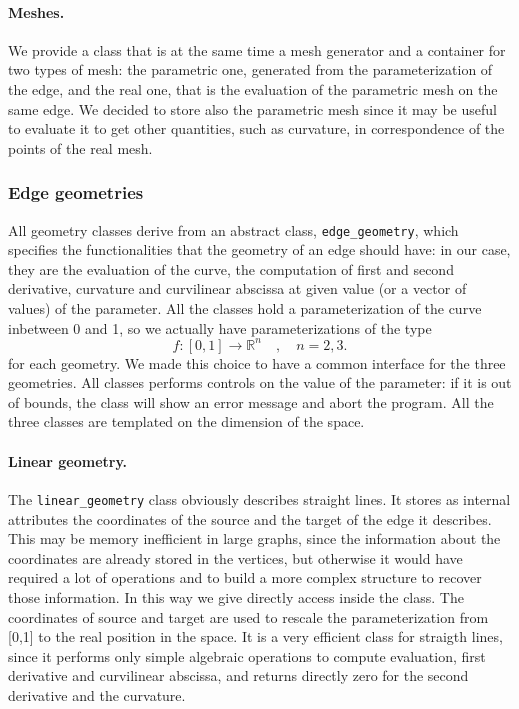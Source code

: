 \documentclass[10pt]{article} %
\newcommand{\classname}[1]{\texttt{#1}}
\begin{document}
	\paragraph{Meshes.} We provide a class that is at the same time a mesh generator and a container for two types of mesh: the parametric one, generated from the parameterization of the edge, and the real one, that is the evaluation of the parametric mesh on the same edge. We decided to store also the parametric mesh since it may be useful to evaluate it to get other quantities, such as curvature, in correspondence of the points of the real mesh.
	
	\subsubsection{Edge geometries}
	All geometry classes derive from an abstract class, \classname{edge\_geometry}, which specifies the functionalities that the geometry of an edge should have: in our case, they are the evaluation of the curve, the computation of first and second derivative, curvature and curvilinear abscissa at given value (or a vector of values) of the parameter. All the classes hold a parameterization of the curve inbetween 0 and 1, so we actually have parameterizations of the type
	\begin{equation*}
	f:[0,1]\rightarrow\mathbb{R}^{n} \quad, \quad n=2,3.
	\end{equation*}
	for each geometry. We made this choice to have a common interface for the three geometries. All classes performs controls on the value of the parameter: if it is out of bounds, the class will show an error message and abort the program. All the three classes are templated on the dimension of the space.
	\paragraph{Linear geometry.} The \classname{linear\_geometry} class obviously describes straight lines. It stores as internal attributes the coordinates of the source and the target of the edge it describes. This may be memory inefficient in large graphs, since the information about the coordinates are already stored in the vertices, but otherwise it would have required a lot of operations and to build a more complex structure to recover those information. In this way we give directly access inside the class. The coordinates of source and target are used to rescale the parameterization from [0,1] to the real position in the space. It is a very efficient class for straigth lines, since it performs only simple algebraic operations to compute evaluation, first derivative and curvilinear abscissa, and returns directly zero for the second derivative and the curvature.
\end{document}

